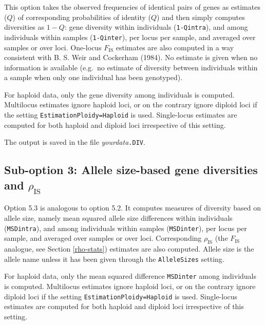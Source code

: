 \documentclass[
  12pt,
]{book}
\begin{document}
This option takes the observed frequencies of identical pairs of genes as estimates (\(Q\)) of corresponding probabilities of identity (\(Q\)) and then simply computes diversities as \(1-Q\): gene diversity within individuals (\texttt{1-Qintra}), and among individuals within samples (\texttt{1-Qinter}), per locus per sample, and averaged over samples or over loci. One-locus \(F_\mathrm{IS}\) estimates are also computed in a way consistent with B. S. Weir and Cockerham (1984). No estimate is given when no information is available (e.g.~no estimate of diversity between individuals within a sample when only one individual has been genotyped).

For haploid data, only the gene diversity among individuals is computed. Multilocus estimates ignore haploid loci, or on the contrary ignore diploid loci if the setting \texttt{EstimationPloidy=Haploid} is used. Single-locus estimates are computed for both haploid and diploid loci irrespective of this setting.

The output is saved in the file \emph{yourdata}\texttt{.DIV}.

\hypertarget{sub-option-3-allele-size-based-gene-diversities-and-rho_mathrmis}{%
\subsection{\texorpdfstring{Sub-option 3: Allele size-based gene diversities and \(\rho_{\mathrm{IS}}\)}{Sub-option 3: Allele size-based gene diversities and \textbackslash rho\_\{\textbackslash mathrm\{IS\}\}}}\label{sub-option-3-allele-size-based-gene-diversities-and-rho_mathrmis}}

Option 5.3 is analogous to option 5.2. It computes measures of diversity
based on allele size, namely mean squared allele size differences within
individuals (\texttt{MSDintra}), and among individuals within samples
(\texttt{MSDinter}), per locus per sample, and averaged over samples or over
loci. Corresponding \(\rho_\mathrm{IS}\) (the \(F_\mathrm{IS}\) analogue, see Section \ref{rho-stats}) estimates are also computed. Allele size is the allele name unless it has been given through the \texttt{AlleleSizes} setting.

For haploid data, only the mean squared difference \texttt{MSDinter} among individuals is computed. Multilocus estimates ignore haploid loci, or on the contrary ignore diploid loci if the setting \texttt{EstimationPloidy=Haploid} is used. Single-locus estimates are computed for both haploid and diploid loci irrespective of this setting.
\end{document}
